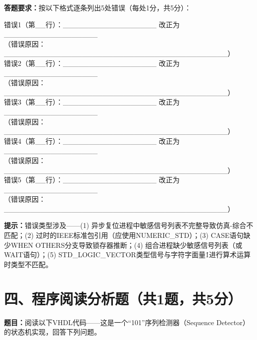 \begin{framed}
\textbf{答题要求：}按以下格式逐条列出5处错误（每处1分，共5分）：

\noindent 错误1（第\_\_行）：\_\_\_\_\_\_\_\_\_\_\_\_\_\_\_\_\_\_ 改正为 \_\_\_\_\_\_\_\_\_\_\_\_\_\_\_\_\_\_\\
\quad（错误原因：\_\_\_\_\_\_\_\_\_\_\_\_\_\_\_\_\_\_\_\_\_\_\_\_\_\_\_\_\_\_\_\_\_\_\_\_\_\_\_\_\_\_\_）\\[0.3cm]
错误2（第\_\_行）：\_\_\_\_\_\_\_\_\_\_\_\_\_\_\_\_\_\_ 改正为 \_\_\_\_\_\_\_\_\_\_\_\_\_\_\_\_\_\_\\
\quad（错误原因：\_\_\_\_\_\_\_\_\_\_\_\_\_\_\_\_\_\_\_\_\_\_\_\_\_\_\_\_\_\_\_\_\_\_\_\_\_\_\_\_\_\_\_）\\[0.3cm]
错误3（第\_\_行）：\_\_\_\_\_\_\_\_\_\_\_\_\_\_\_\_\_\_ 改正为 \_\_\_\_\_\_\_\_\_\_\_\_\_\_\_\_\_\_\\
\quad（错误原因：\_\_\_\_\_\_\_\_\_\_\_\_\_\_\_\_\_\_\_\_\_\_\_\_\_\_\_\_\_\_\_\_\_\_\_\_\_\_\_\_\_\_\_）\\[0.3cm]
错误4（第\_\_行）：\_\_\_\_\_\_\_\_\_\_\_\_\_\_\_\_\_\_ 改正为 \_\_\_\_\_\_\_\_\_\_\_\_\_\_\_\_\_\_\\
\quad（错误原因：\_\_\_\_\_\_\_\_\_\_\_\_\_\_\_\_\_\_\_\_\_\_\_\_\_\_\_\_\_\_\_\_\_\_\_\_\_\_\_\_\_\_\_）\\[0.3cm]
错误5（第\_\_行）：\_\_\_\_\_\_\_\_\_\_\_\_\_\_\_\_\_\_ 改正为 \_\_\_\_\_\_\_\_\_\_\_\_\_\_\_\_\_\_\\
\quad（错误原因：\_\_\_\_\_\_\_\_\_\_\_\_\_\_\_\_\_\_\_\_\_\_\_\_\_\_\_\_\_\_\_\_\_\_\_\_\_\_\_\_\_\_\_）

\vspace{0.3cm}
\noindent\textbf{提示：}错误类型涉及——(1) 异步复位进程中敏感信号列表不完整导致仿真-综合不匹配；(2) 过时的IEEE标准包引用（应使用NUMERIC\_STD）；(3) CASE语句缺少WHEN OTHERS分支导致锁存器推断；(4) 组合进程缺少敏感信号列表（或WAIT语句）；(5) STD\_LOGIC\_VECTOR类型信号与字符字面量\'1\'进行算术运算时类型不匹配。
\end{framed}

\newpage

\section*{四、程序阅读分析题（共1题，共5分）}

\textbf{题目：}阅读以下VHDL代码——这是一个“101”序列检测器（Sequence Detector）的状态机实现，回答下列问题。

